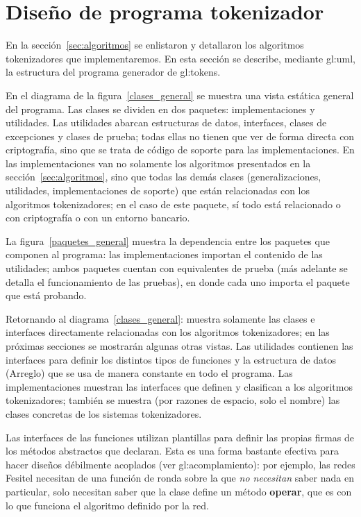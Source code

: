 %
%

\section{Diseño de programa tokenizador}

En la sección~\ref{sec:algoritmos} se enlistaron y detallaron los algoritmos
tokenizadores que implementaremos. En esta sección se describe, mediante
\gls{gl:uml}, la estructura del programa generador de \glspl{gl:token}.

En el diagrama de la figura~\ref{clases_general} se muestra una vista estática
general del programa. Las clases se dividen en dos paquetes: implementaciones
y utilidades. Las utilidades abarcan estructuras de datos, interfaces,
clases de excepciones y clases de prueba; todas ellas no tienen que ver
de forma directa con criptografía, sino que se trata de código de soporte
para las implementaciones. En las implementaciones van no solamente
los algoritmos presentados en la sección~\ref{sec:algoritmos}, sino que todas
las demás clases (generalizaciones, utilidades, implementaciones de
soporte) que están relacionadas con los algoritmos tokenizadores; en el caso
de este paquete, sí todo está relacionado o con criptografía o con un
entorno bancario.

La figura~\ref{paquetes_general} muestra la dependencia entre los paquetes que
componen al programa: las implementaciones importan el contenido de las
utilidades; ambos paquetes cuentan con equivalentes de prueba (más adelante se
detalla el funcionamiento de las pruebas), en donde cada uno importa el paquete
que está probando.

Retornando al diagrama~\ref{clases_general}: muestra solamente las clases
e interfaces directamente relacionadas con los algoritmos tokenizadores;
en las próximas secciones se mostrarán algunas otras vistas. Las utilidades
contienen las interfaces para definir los distintos tipos de funciones y la
estructura de datos (Arreglo) que se usa de manera constante en todo el
programa. Las implementaciones muestran las interfaces que definen y clasifican
a los algoritmos tokenizadores; también se muestra (por razones de espacio,
solo el nombre) las clases concretas de los sistemas tokenizadores.

Las interfaces de las funciones utilizan plantillas para definir las propias
firmas de los métodos abstractos que declaran. Esta es una forma bastante
efectiva para hacer diseños débilmente acoplados (ver
\gls{gl:acomplamiento}): por ejemplo, las redes Fesitel necesitan
de una función de ronda sobre la que \textit{no necesitan} saber nada en
particular, solo necesitan saber que la clase define un método \textbf{operar},
que es con lo que funciona el algoritmo definido por la red.

